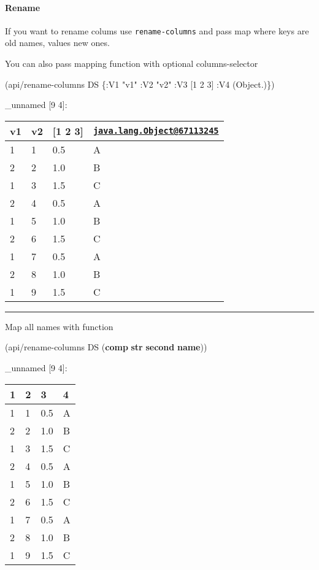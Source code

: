 \documentclass[]{article}
\newenvironment{Shaded}{\begin{snugshade}}{\end{snugshade}}
\newcommand{\AttributeTok}[1]{\textcolor[rgb]{0.77,0.63,0.00}{#1}}
\newcommand{\DecValTok}[1]{\textcolor[rgb]{0.00,0.00,0.81}{#1}}
\newcommand{\KeywordTok}[1]{\textcolor[rgb]{0.13,0.29,0.53}{\textbf{#1}}}
\newcommand{\NormalTok}[1]{#1}
\newcommand{\StringTok}[1]{\textcolor[rgb]{0.31,0.60,0.02}{#1}}
\let\oldparagraph\paragraph
\renewcommand{\paragraph}[1]{\oldparagraph{#1}\mbox{}}
\begin{document}
\hypertarget{rename}{%
\paragraph{Rename}\label{rename}}

If you want to rename colums use \texttt{rename-columns} and pass map
where keys are old names, values new ones.

You can also pass mapping function with optional columns-selector

\begin{Shaded}
\begin{Highlighting}[]
\NormalTok{(api/rename-columns DS \{}\AttributeTok{:V1} \StringTok{"v1"}
                        \AttributeTok{:V2} \StringTok{"v2"}
                        \AttributeTok{:V3}\NormalTok{ [}\DecValTok{1} \DecValTok{2} \DecValTok{3}\NormalTok{]}
                        \AttributeTok{:V4}\NormalTok{ (Object.)\})}
\end{Highlighting}
\end{Shaded}

\_unnamed {[}9 4{]}:

\begin{longtable}[]{@{}llll@{}}
\toprule
v1 & v2 & {[}1 2 3{]} &
\href{mailto:java.lang.Object@67113245}{\nolinkurl{java.lang.Object@67113245}}\tabularnewline
\midrule
\endhead
1 & 1 & 0.5 & A\tabularnewline
2 & 2 & 1.0 & B\tabularnewline
1 & 3 & 1.5 & C\tabularnewline
2 & 4 & 0.5 & A\tabularnewline
1 & 5 & 1.0 & B\tabularnewline
2 & 6 & 1.5 & C\tabularnewline
1 & 7 & 0.5 & A\tabularnewline
2 & 8 & 1.0 & B\tabularnewline
1 & 9 & 1.5 & C\tabularnewline
\bottomrule
\end{longtable}

\begin{center}\rule{0.5\linewidth}{0.5pt}\end{center}

Map all names with function

\begin{Shaded}
\begin{Highlighting}[]
\NormalTok{(api/rename-columns DS (}\KeywordTok{comp} \KeywordTok{str} \KeywordTok{second} \KeywordTok{name}\NormalTok{))}
\end{Highlighting}
\end{Shaded}

\_unnamed {[}9 4{]}:

\begin{longtable}[]{@{}llll@{}}
\toprule
1 & 2 & 3 & 4\tabularnewline
\midrule
\endhead
1 & 1 & 0.5 & A\tabularnewline
2 & 2 & 1.0 & B\tabularnewline
1 & 3 & 1.5 & C\tabularnewline
2 & 4 & 0.5 & A\tabularnewline
1 & 5 & 1.0 & B\tabularnewline
2 & 6 & 1.5 & C\tabularnewline
1 & 7 & 0.5 & A\tabularnewline
2 & 8 & 1.0 & B\tabularnewline
1 & 9 & 1.5 & C\tabularnewline
\bottomrule
\end{longtable}
\end{document}
